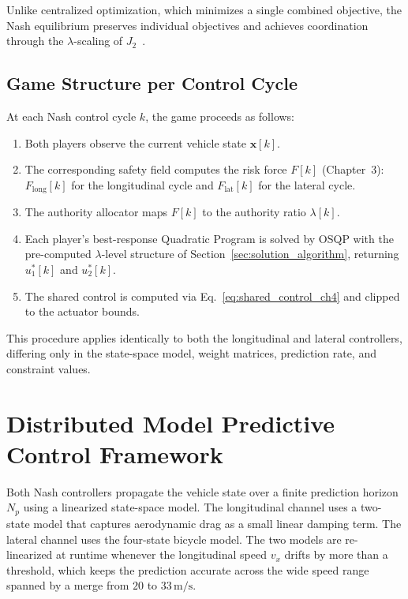 \documentclass[12pt,a4paper,oneside]{report}
\begin{document}
Unlike centralized optimization, which minimizes a single combined objective, the Nash equilibrium preserves individual objectives and achieves coordination through the $\lambda$-scaling of $J_2$~\cite{liSharedControlNovel2019}.

\subsection{Game Structure per Control Cycle}

At each Nash control cycle $k$, the game proceeds as follows:
\begin{enumerate}
\item Both players observe the current vehicle state $\mathbf{x}[k]$.
\item The corresponding safety field computes the risk force $F[k]$ (Chapter~3): $F_{\text{long}}[k]$ for the longitudinal cycle and $F_{\text{lat}}[k]$ for the lateral cycle.
\item The authority allocator maps $F[k]$ to the authority ratio $\lambda[k]$.
\item Each player's best-response Quadratic Program is solved by OSQP with the pre-computed $\lambda$-level structure of Section~\ref{sec:solution_algorithm}, returning $u_1^{*}[k]$ and $u_2^{*}[k]$.
\item The shared control is computed via Eq.~\eqref{eq:shared_control_ch4} and clipped to the actuator bounds.
\end{enumerate}

This procedure applies identically to both the longitudinal and lateral controllers, differing only in the state-space model, weight matrices, prediction rate, and constraint values.


\section{Distributed Model Predictive Control Framework}
\label{sec:dmpc}

Both Nash controllers propagate the vehicle state over a finite prediction horizon $N_p$ using a linearized state-space model. The longitudinal channel uses a two-state model that captures aerodynamic drag as a small linear damping term. The lateral channel uses the four-state bicycle model. The two models are re-linearized at runtime whenever the longitudinal speed $v_x$ drifts by more than a threshold, which keeps the prediction accurate across the wide speed range spanned by a merge from $20$ to $33\,\mathrm{m/s}$.
\end{document}
